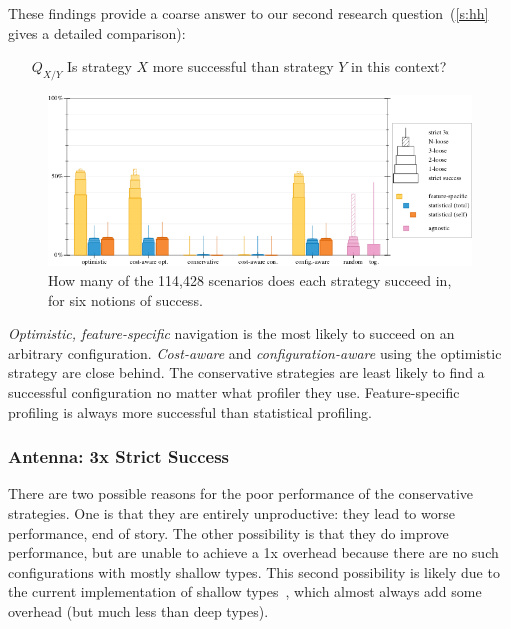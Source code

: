 These findings provide a coarse answer to our second research question~(\cref{s:hh} gives a detailed comparison):

\begin{itemize}
\item[$Q_{X/Y}$] Is strategy $X$ more successful than strategy $Y$ in this
  context?
\end{itemize}

\begin{figure}[ht]
  \includegraphics[width=\columnwidth]{data/strategy-overall-feasible.pdf}
  \caption{How many of the 114,428 scenarios does each strategy succeed in, for six notions of success.}
  \label{f:strategy-overall}
\end{figure}

\emph{Optimistic, feature-specific} navigation is the most likely to
succeed on an arbitrary configuration.
\emph{Cost-aware} and \emph{configuration-aware} using the optimistic strategy
are close behind.
The conservative strategies are least likely to find a successful configuration
no matter what profiler they use.
Feature-specific profiling is always more successful than statistical profiling.

\subsubsection{Antenna: 3x Strict Success}
\label{s:antenna}

There are two possible reasons for the poor performance of the conservative
strategies.
One is that they are entirely unproductive: they lead to worse performance, end
of story.
The other possibility is that they do improve performance, but are unable
to achieve a 1x overhead because there are no such configurations with
mostly shallow types.
This second possibility is likely due to the current implementation of shallow
types~\cite{g-deep-shallow}, which almost always add some overhead (but much
less than deep types).

